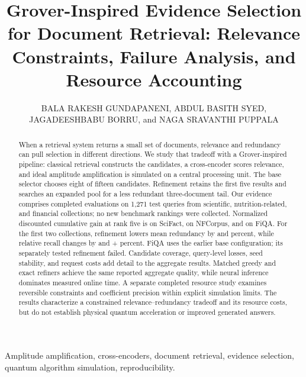 \documentclass[nolineno]{ieeeaccess}
\begin{document}
\vol{--}
\title{Grover-Inspired Evidence Selection for Document Retrieval: Relevance Constraints, Failure Analysis, and Resource Accounting}
\author{\uppercase{Bala Rakesh Gundapaneni}, \uppercase{Abdul Basith Syed}, \uppercase{Jagadeeshbabu Borru}, and \uppercase{Naga Sravanthi Puppala}}
\address[1]{Department of Computer Science and Engineering, SRM University AP, Andhra Pradesh 522502, India}
\begin{abstract}
When a retrieval system returns a small set of documents, relevance and redundancy can pull selection in different directions. We study that tradeoff with a Grover-inspired pipeline: classical retrieval constructs the candidates, a cross-encoder scores relevance, and ideal amplitude amplification is simulated on a central processing unit. The base selector chooses eight of fifteen candidates. Refinement retains the first five results and searches an expanded pool for a less redundant three-document tail. Our evidence comprises completed evaluations on 1,271 test queries from scientific, nutrition-related, and financial collections; no new benchmark rankings were collected. Normalized discounted cumulative gain at rank five is \scifactNdcg{} on SciFact, \nfcorpusNdcg{} on NFCorpus, and \fiqaNdcg{} on FiQA. For the first two collections, refinement lowers mean redundancy by \scifactRedReduction{} and \nfcorpusRedReduction{} percent, while relative recall changes by \scifactRecallChange{} and +\nfcorpusRecallChange{} percent. FiQA uses the earlier base configuration; its separately tested refinement failed. Candidate coverage, query-level losses, seed stability, and request costs add detail to the aggregate results. Matched greedy and exact refiners achieve the same reported aggregate quality, while neural inference dominates measured online time. A separate completed resource study examines reversible constraints and coefficient precision within explicit simulation limits. The results characterize a constrained relevance--redundancy tradeoff and its resource costs, but do not establish physical quantum acceleration or improved generated answers.
\end{abstract}
\begin{keywords}
Amplitude amplification, cross-encoders, document retrieval, evidence selection, quantum algorithm simulation, reproducibility.
\end{keywords}
\maketitle
\raggedbottom










\end{document}
